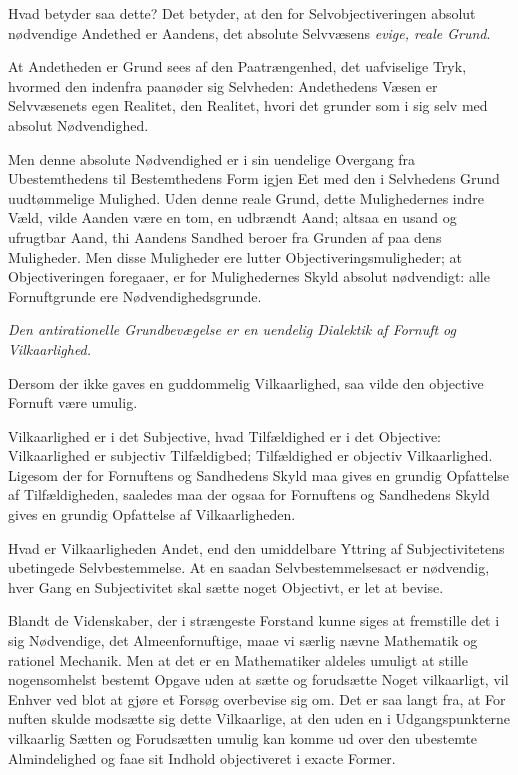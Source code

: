 \documentclass[12pt]{book}
\newcommand{\opage}[1]{\marginnote{\footnotesize\textit{[#1]}}}
\begin{document}
Hvad betyder saa dette? Det betyder, at den for Selvobjectiveringen
absolut nødvendige Andethed er Aandens, det absolute Selvvæsens
\emph{evige, reale Grund}.

At Andetheden er Grund sees af den Paatrængenhed, det uafviselige
Tryk, hvormed den indenfra paanøder sig Selvheden: Andethedens Væsen
er Selvvæsenets egen Realitet,
\opage{80} den Realitet, hvori det grunder som i sig selv med absolut
Nødvendighed.

Men denne absolute Nødvendighed er i sin uendelige Overgang fra
Ubestemthedens til Bestemthedens Form igjen Eet med den i Selvhedens
Grund uudtømmelige Mulighed. Uden denne reale Grund, dette
Mulighedernes indre Væld, vilde Aanden være en tom, en udbrændt
Aand; altsaa en usand og ufrugtbar Aand, thi Aandens Sandhed beroer
fra Grunden af paa dens Muligheder. Men disse Muligheder ere lutter
Objectiveringsmuligheder; at Objectiveringen foregaaer, er for
Mulighedernes Skyld absolut nødvendigt: alle Fornuftgrunde ere
Nødvendighedsgrunde.

\emph{Den antirationelle Grundbevægelse er en uendelig Dialektik af
Fornuft og Vilkaarlighed.}

Dersom der ikke gaves en guddommelig Vilkaarlighed, saa vilde den
objective Fornuft være umulig.

Vilkaarlighed er i det Subjective, hvad Tilfældighed er i det
Objective: Vilkaarlighed er subjectiv Tilfældigbed; Tilfældighed er
objectiv Vilkaarlighed. Ligesom der for Fornuftens og Sandhedens
Skyld maa gives en grundig Opfattelse af Tilfældigheden, saaledes
maa der ogsaa for Fornuftens og Sandhedens Skyld gives en grundig
Opfattelse af Vilkaarligheden.

Hvad er Vilkaarligheden Andet, end den umiddelbare Yttring af
Subjectivitetens ubetingede Selvbestemmelse. At en saadan
Selvbestemmelsesact er nødvendig, hver Gang en Subjectivitet skal
sætte noget Objectivt, er let at bevise.

Blandt de Videnskaber, der i strængeste Forstand kunne siges at
fremstille det i sig Nødvendige, det Almeenfornuftige, maae vi
særlig nævne Mathematik og rationel Mechanik. Men at det er en
Mathematiker aldeles umuligt at stille nogensomhelst bestemt Opgave
uden at sætte og forudsætte Noget vilkaarligt, vil Enhver ved blot
at gjøre et Forsøg overbevise sig om. Det er saa langt fra, at For\-%
\opage{81}nuften skulde modsætte sig dette Vilkaarlige, at den uden en i
Udgangspunkterne vilkaarlig Sætten og Forudsætten umulig kan komme
ud over den ubestemte Almindelighed og faae sit Indhold objectiveret
i exacte Former.
\end{document}
